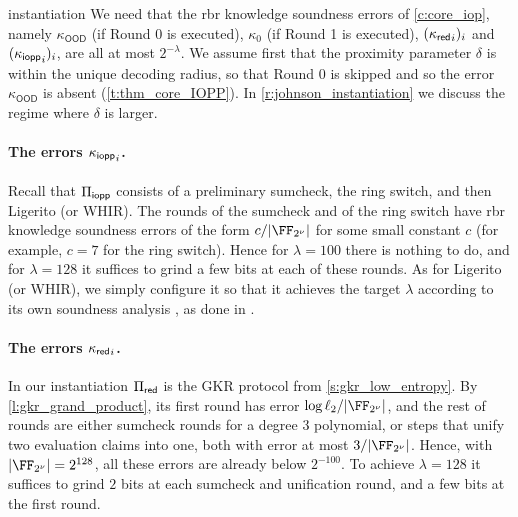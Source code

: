 \begin{lncsappendix}{instantiation}
\noindent We need that the rbr knowledge soundness errors of \cref{c:core_iop}, namely $\kappa_{\mathsf{OOD}}$ (if Round 0 is executed), $\kappa_0$ (if Round 1 is executed), $({\kappa_{\mathsf{red}}}_i)_{i}$ and $({\kappa_{\mathsf{iopp}}}_i)_{i}$, are all at most $2^{-\lambda}$. We assume first that the proximity parameter $\delta$ is within the unique decoding radius, so that Round 0 is skipped and so the error $\kappa_{\mathsf{OOD}}$ is absent (\cref{t:thm_core_IOPP}). In \cref{r:johnson_instantiation} we discuss the regime where $\delta$ is larger.
%

 


%






\paragraph{The errors ${\kappa_{\mathsf{iopp}}}_i$.} Recall that $\Pi_{\mathsf{iopp}}$ consists of a preliminary sumcheck, the ring switch, and then Ligerito (or WHIR). The rounds of the sumcheck and of the ring switch have rbr knowledge soundness errors of the form $c/|\comfield|$ for some small constant $c$ (for example, $c=7$ for the ring switch). Hence for $\lambda=100$ there is nothing to do, and for $\lambda=128$ it suffices to grind a few bits  at each of these rounds. As for Ligerito (or WHIR), we simply configure it so that it achieves the target $\lambda$ according to its own soundness analysis \cite{Ligerito,whir,stir}, as done in \cite{flock,whir-repo}. 

\paragraph{The errors ${\kappa_{\mathsf{red}}}_i$.} In our instantiation $\Pi_{\mathsf{red}}$ is the GKR protocol from \cref{s:gkr_low_entropy}. By \cref{l:gkr_grand_product}, its first round has error $\log\codedim_2/|\comfield|$, and the rest of rounds are either sumcheck rounds for a degree $3$ polynomial, or steps that unify two evaluation claims into one, both with error at most $3/|\comfield|$. Hence, with $|\comfield|=2^{128}$, all these errors are already below $2^{-100}$. To achieve $\lambda=128$ it suffices to grind $2$ bits at each sumcheck and unification round, and a few bits at the first round. 


\end{lncsappendix}
